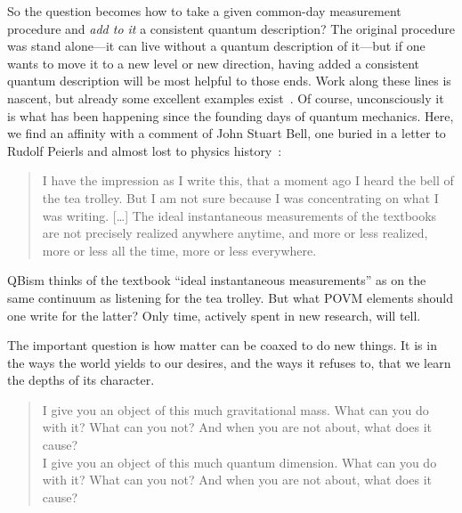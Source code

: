 \documentclass[aps,pra,superscriptaddress,10pt,tightenlines,twocolumn,nofootinbib]{revtex4}
\begin{document}
So the question becomes how to take a given common-day measurement procedure and {\it add to it\/} a consistent quantum description?  The original procedure was stand alone---it can live without a quantum description of it---but if one wants to move it to a new level or new direction, having added a consistent quantum description will be most helpful to those ends.  Work along these lines is nascent, but already some excellent examples exist~\cite{Kofler08}.  Of course, unconsciously it is what has been happening since the founding days of quantum mechanics.  Here, we find an affinity with a comment of John Stuart Bell, one buried in a letter to Rudolf Peierls and almost lost to physics history~\cite{Mermin14}:
\begin{quote}
 \noindent I have the impression as I write this, that a moment ago I heard the
bell of the tea trolley. But I am not sure because I was concentrating
on what I was writing. [\ldots\!] The ideal instantaneous measurements of the
textbooks are not precisely realized anywhere anytime, and more or less
realized, more or less all the time, more or less everywhere.
\end{quote}
QBism thinks of the textbook ``ideal instantaneous measurements'' as on the same continuum as listening for the tea trolley.  But what POVM elements should one write for the latter?  Only time, actively spent in new research, will tell.

The important question is how matter can be coaxed to do new things.  It is in the ways the world yields to our desires, and the ways it refuses to, that we learn the depths of its character.
\begin{verse}
I give you an object of this much gravitational mass.  What can you do with it?  What can you not?  And when you are not about, what does it cause?
\\
I give you an object of this much quantum dim\-ension.  What can you do with it?  What can you not?  And when you are not about, what does it cause?
\end{verse}
\end{document}

